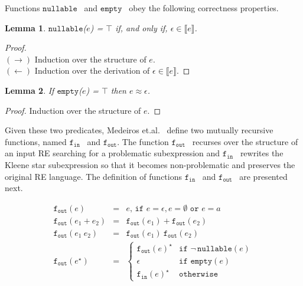 \documentclass[oneside,12pt]{scrbook}
\newtheorem{Lemma}{Lemma}
\theoremstyle{definition}
\newcommand{\sembrackets}[1]{\ensuremath{\llbracket #1 \rrbracket}}
\newcommand{\nullable}{\ensuremath{\texttt{nullable}}}
\newcommand{\emptyy}{\ensuremath{\texttt{empty}}}
\newcommand{\fin}{\ensuremath{\texttt{f$_{\texttt{in}}$}}}
\newcommand{\fout}{\ensuremath{\texttt{f$_{\texttt{out}}$}}}
\theoremstyle{plain}
\theoremstyle{definition}
\begin{document}
Functions \nullable~ and \emptyy~ obey the following correctness properties.


\begin{Lemma}
	\nullable($e$) = $\top$ if, and only if, $\epsilon\in\sembrackets{e}$.
\end{Lemma}
\begin{proof}$\,$\\
	$(\to)$ Induction over the structure of $e$. \\$(\leftarrow)$ Induction over the derivation of $\epsilon \in\sembrackets{e}$.
\end{proof}

\begin{Lemma}
	If \emptyy($e$) = $\top$ then $e \approx \epsilon$.
\end{Lemma}
\begin{proof}
	Induction over the structure of $e$.
\end{proof}


Given these two predicates, Medeiros et.al.~\cite{Medeiros14} define two mutually recursive functions,
named \fin~ and \fout. The function \fout~ recurses over the structure of an input RE
searching for a problematic subexpression and \fin~ rewrites the Kleene star subexpression
so that it becomes non-problematic and preserves the original RE language. The definition of functions \fin~ and \fout~ are presented next.

\[
\begin{array}{lcl}
\fout(e) & = & e,\,\texttt{if } e = \epsilon, e = \emptyset \texttt{ or } e = a\\
\fout(e_1 + e_2) & = & \fout(e_1) + \fout(e_2) \\
\fout(e_1\:e_2) & = & \fout(e_1)\:\fout(e_2)\\
\fout(e^\star) & = & \left\{
\begin{array}{ll}
\fout(e)^\star & \texttt{if } \neg\,\nullable(e)\\
\epsilon       & \texttt{if } \emptyy(e)\\
\fin(e)^\star  & \texttt{otherwise}
\end{array}
\right.
\end{array}
\]
\end{document}
